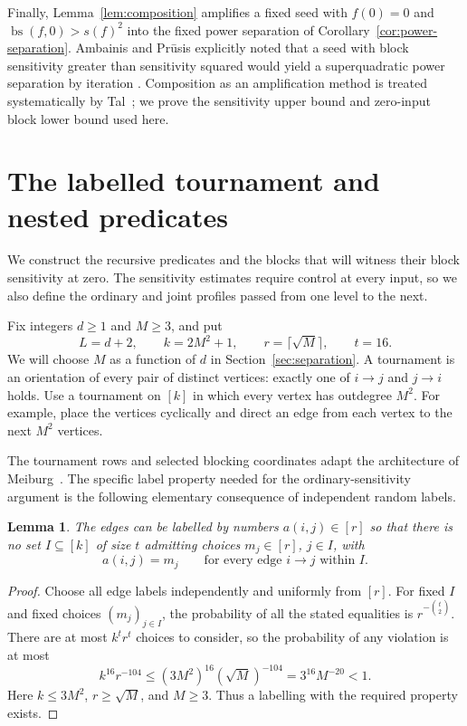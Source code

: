 \documentclass[11pt]{article}
\newcommand{\bs}{\operatorname{bs}}
\newtheorem{lemma}[theorem]{Lemma}
\theoremstyle{definition}
\theoremstyle{remark}
\begin{document}
Finally, Lemma~\ref{lem:composition} amplifies a fixed seed with
\(f(0)=0\) and \(\bs(f,0)>s(f)^2\) into the fixed power separation of
Corollary~\ref{cor:power-separation}. Ambainis and Pr\={u}sis explicitly
noted that a seed with block sensitivity greater than sensitivity squared
would yield a superquadratic power separation by iteration
\cite[Section~1]{AmbainisPrusis2014}. Composition as an amplification method
is treated systematically by Tal~\cite{Tal2013}; we prove the sensitivity
upper bound and zero-input block lower bound used here.

\section{The labelled tournament and nested predicates}
\label{sec:construction}

We construct the recursive predicates and the blocks that will witness their
block sensitivity at zero. The sensitivity estimates require control at
every input, so we also define the ordinary and joint profiles passed from
one level to the next.

Fix integers \(d\ge1\) and \(M\ge3\), and put
\[
 L=d+2,\qquad k=2M^2+1,\qquad r=\lceil\sqrt M\rceil,
 \qquad t=16.
\]
We will choose \(M\) as a function of \(d\) in
Section~\ref{sec:separation}.
A tournament is an orientation of every pair of distinct vertices:
exactly one of \(i\to j\) and \(j\to i\) holds.
Use a tournament on \([k]\) in which every vertex has outdegree \(M^2\).
For example, place the vertices cyclically and direct an edge from
each vertex to the next \(M^2\) vertices.

The tournament rows and selected blocking coordinates adapt the architecture
of Meiburg~\cite[Sections~3.1 and~5.2--5.5]{Meiburg2026}.
The specific label property needed for the ordinary-sensitivity argument is
the following elementary consequence of independent random labels.

\begin{lemma}\label{lem:labelling}
The edges can be labelled by numbers \(a(i,j)\in[r]\) so that there is
no set \(I\subseteq[k]\) of size \(t\) admitting choices
\(m_j\in[r]\), \(j\in I\), with
\[
 a(i,j)=m_j \qquad\text{for every edge }i\to j\text{ within }I.
\]
\end{lemma}
\begin{proof}
Choose all edge labels independently and uniformly from \([r]\).
For fixed \(I\) and fixed choices \((m_j)_{j\in I}\), the probability
of all the stated equalities is \(r^{-\binom t2}\).
There are at most \(k^t r^t\) choices to consider, so the probability
of any violation is at most
\[
 k^{16}r^{-104}\le (3M^2)^{16}(\sqrt M)^{-104}
 =3^{16}M^{-20}<1.
\]
Here \(k\le3M^2\), \(r\ge\sqrt M\), and \(M\ge3\).
Thus a labelling with the required property exists.
\end{proof}
\end{document}
